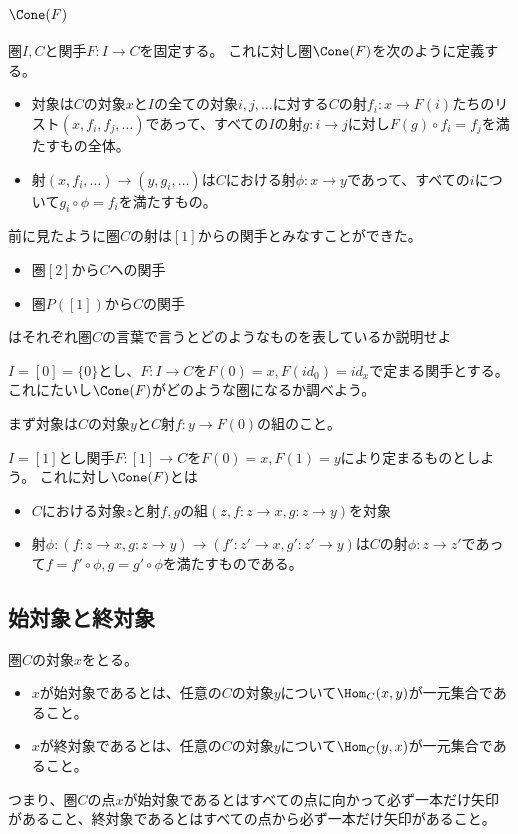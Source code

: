 \documentclass[uplatex]{jsarticle}
\begin{document}
\subsection{$\Cone(F)$}
圏$I,C$と関手$F:I\to C$を固定する。
これに対し圏$\Cone(F)$を次のように定義する。
\begin{itemize}
\item 対象は$C$の対象$x$と$I$の全ての対象$i,j,\ldots$に対する$C$の射$f_i:x\to F(i)$たちのリスト$(x,f_i,f_j,\ldots)$であって、すべての$I$の射$g:i\to j$に対し$F(g)\circ f_i=f_j$を満たすもの全体。
\item 射$(x,f_i,\ldots)\to(y,g_i,\ldots)$は$C$における射$\phi:x\to y$であって、すべての$i$について$g_i\circ\phi=f_i$を満たすもの。
\end{itemize}


前に見たように圏$C$の射は$[1]$からの関手とみなすことができた。
\begin{itemize}
\item 圏$[2]$から$C$ヘの関手
\item 圏$P([1])$から$C$の関手
\end{itemize}
はそれぞれ圏$C$の言葉で言うとどのようなものを表しているか説明せよ


\begin{eg}
$I=[0]=\{0\}$とし、$F\colon I\to C$を$F(0)=x, F(id_0)=id_x$で定まる関手とする。
これにたいし$\Cone(F)$がどのような圏になるか調べよう。

まず対象は$C$の対象$y$と$C$射$f\colon y\to F(0)$の組のこと。
\end{eg}

\begin{eg}
$I=[1]$とし関手$F:[1]\to C$を$F(0)=x, F(1)=y$により定まるものとしよう。
これに対し$\Cone(F)$とは
\begin{itemize}
\item $C$における対象$z$と射$f,g$の組$(z, f:z\to x, g:z\to y)$を対象
\item 射$\phi:(f:z\to x,g:z\to y)\to (f':z'\to x,g':z'\to y)$は$C$の射$\phi:z\to z'$であって$f=f'\circ\phi, g=g'\circ\phi$を満たすものである。
\end{itemize}
\end{eg}

\subsection{始対象と終対象}
\begin{dfn}
圏$C$の対象$x$をとる。
\begin{itemize}
\item $x$が始対象であるとは、任意の$C$の対象$y$について$\Hom_C(x,y)$が一元集合であること。
\item $x$が終対象であるとは、任意の$C$の対象$y$について$\Hom_C(y,x)$が一元集合であること。
\end{itemize}
\end{dfn}
つまり、圏$C$の点$x$が始対象であるとはすべての点に向かって必ず一本だけ矢印があること、終対象であるとはすべての点から必ず一本だけ矢印があること。
\end{document}
